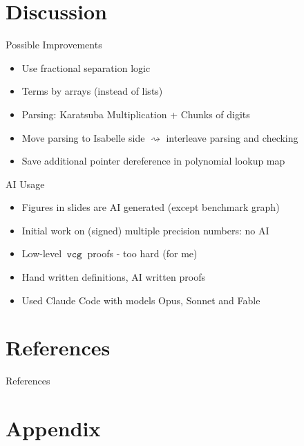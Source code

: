 \documentclass[aspectratio=169, 11pt]{beamer}
\begin{document}
\section{Discussion}

\begin{frame}{Possible Improvements}
    \begin{itemize}
        \item Use fractional separation logic \cite{isabelle-llvm-fractional}
        \item Terms by arrays (instead of lists)
        \item Parsing: Karatsuba Multiplication + Chunks of digits
        \item Move parsing to Isabelle side
              $\rightsquigarrow$ interleave parsing and checking
        \item Save additional pointer dereference in polynomial lookup map
    \end{itemize}
\end{frame}

\begin{frame}{AI Usage}
    \begin{itemize}
        \item Figures in slides are AI generated (except benchmark graph)
        \item Initial work on (signed) multiple precision numbers: no AI
        \item Low-level $\,\text{\ttfamily vcg}\,$ proofs - too hard (for me)
        \item Hand written definitions, AI written proofs
        \item Used Claude Code with models Opus, Sonnet and Fable
    \end{itemize}
\end{frame}

\appendix

\section{References}

\begin{frame}[allowframebreaks]{References}
    \printbibliography[heading=none]
\end{frame}

\section{Appendix}
\end{document}
